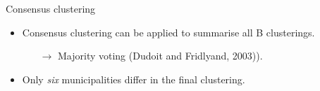 \documentclass[9pt]{beamer}
\begin{document}
\begin{frame}[t]{Consensus clustering}

\begin{itemize}
\item Consensus clustering can be applied to summarise all B clusterings. 
\begin{itemize}\item[$\rightarrow$] Majority voting (Dudoit and Fridlyand, 2003)).\end{itemize}
\item<4> Only \emph{six} municipalities differ in the final clustering.
\end{itemize}

\begin{columns}
\begin{column}{0.5\textwidth}
\begin{figure}\vspace{-0.20cm}%

\end{figure}
\end{column}
\end{columns}
\end{frame}
\end{document}

